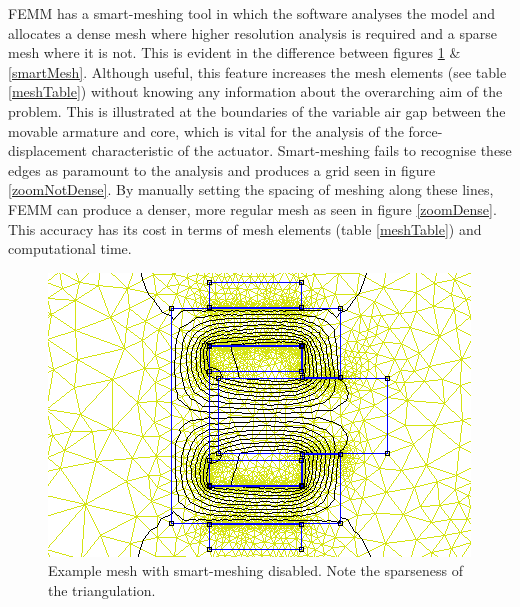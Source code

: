 \documentclass[a4paper]{IEEEtran}
\begin{document}
    FEMM has a smart-meshing tool in which the software analyses the model and allocates a dense mesh where higher resolution analysis is required and a sparse mesh where it is not. This is evident in the difference between figures \ref{noSmartMesh} \& \ref{smartMesh}. Although useful, this feature increases the mesh elements (see table \ref{meshTable}) without knowing any information about the overarching aim of the problem. This is illustrated at the boundaries of the variable air gap between the movable armature and core, which is vital for the analysis of the force-displacement characteristic of the actuator. Smart-meshing fails to recognise these edges as paramount to the analysis and produces a grid seen in figure \ref{zoomNotDense}. By manually setting the spacing of meshing along these lines, FEMM can produce a denser, more regular mesh as seen in figure \ref{zoomDense}. This accuracy has its cost in terms of mesh elements (table \ref{meshTable}) and computational time.

    \begin{figure}[ht]
        \includegraphics[width = \linewidth]{Smartmesh-OFF-NotDenseAirgap.png}
        \caption{Example mesh with smart-meshing disabled. Note the sparseness of the triangulation.}
        \label{noSmartMesh} 
    \end{figure}
\end{document}
